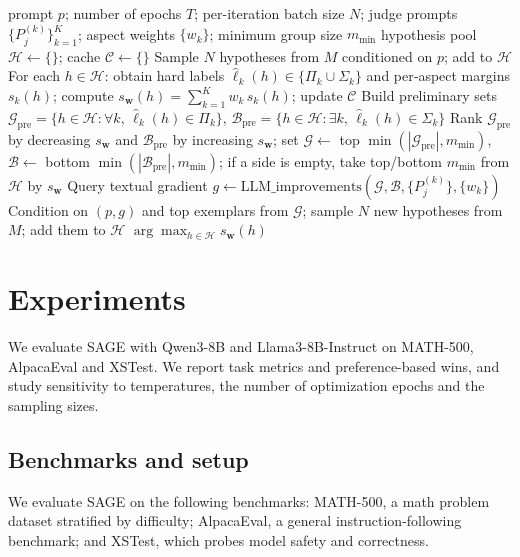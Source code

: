 \documentclass{article}
\theoremstyle{plain}
\theoremstyle{definition}
\theoremstyle{remark}
\newcommand{\method}{SAGE} %
\newcommand{\batchN}{N}
\begin{document}
\begin{algorithm}[t]
\caption{\method{}: Self-judged iterative response refinement over \(T\) epochs}
\label{alg:method}
\begin{algorithmic}
    prompt \(p\); number of epochs \(T\); per-iteration batch size \(\batchN\); judge prompts \(\{P^{(k)}_j\}_{k=1}^K\); aspect weights \(\{w_k\}\); minimum group size \(m_{\min}\)
    hypothesis pool \(\mathcal{H} \leftarrow \{\}\); cache \(\mathcal{C}\leftarrow \{\}\)
    Sample \(\batchN\) hypotheses from \(M\) conditioned on \(p\); add to \(\mathcal{H}\)
     \STATE For each \(h\in\mathcal{H}\): obtain hard labels \(\hat\ell_k(h)\in\{\Pi_k\cup\Sigma_k\}\) and per‑aspect margins \(s_k(h)\); compute \(s_{\mathbf{w}}(h)=\sum_{k=1}^K w_k\, s_k(h)\); update \(\mathcal{C}\)
     \STATE Build preliminary sets \(\mathcal{G}_{\text{pre}}=\{h\in\mathcal{H}: \forall k,\, \hat\ell_k(h)\in \Pi_k\}\), \(\mathcal{B}_{\text{pre}}=\{h\in\mathcal{H}: \exists k,\, \hat\ell_k(h)\in \Sigma_k\}\)
     \STATE Rank \(\mathcal{G}_{\text{pre}}\) by decreasing \(s_{\mathbf{w}}\) and \(\mathcal{B}_{\text{pre}}\) by increasing \(s_{\mathbf{w}}\); set \(\mathcal{G}\leftarrow\) top \(\min(|\mathcal{G}_{\text{pre}}|,m_{\min})\), \(\mathcal{B}\leftarrow\) bottom \(\min(|\mathcal{B}_{\text{pre}}|,m_{\min})\); if a side is empty, take top/bottom \(m_{\min}\) from \(\mathcal{H}\) by \(s_{\mathbf{w}}\)
     \STATE Query textual gradient \(g \leftarrow \text{LLM\_improvements}(\mathcal{G}, \mathcal{B}, \{P^{\!(k)}_j\}, \{w_k\})\)
     \STATE Condition on \((p, g)\) and top exemplars from \(\mathcal{G}\); sample \(\batchN\) new hypotheses from \(M\); add them to \(\mathcal{H}\)
   \ENDFOR
    \(\arg\max_{h\in\mathcal{H}} s_{\mathbf{w}}(h)\)
\end{algorithmic}
\end{algorithm}

\section{Experiments}
\label{sec:experiments}
We evaluate \method{} with Qwen3-8B \citep{yang2025qwen3} and Llama3-8B-Instruct \citet{grattafiori2024llama} on MATH-500, AlpacaEval and XSTest. We report task metrics and preference-based wins, and study sensitivity to temperatures, the number of optimization epochs and the sampling sizes.

\subsection{Benchmarks and setup}
We evaluate \method{} on the following benchmarks:
MATH-500, a math problem dataset stratified by difficulty; AlpacaEval, a general instruction-following benchmark; and XSTest, which probes model safety and correctness.
\end{document}
